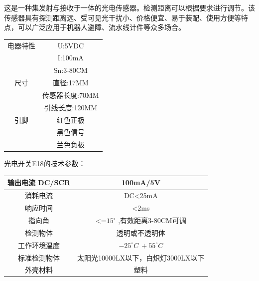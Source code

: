 \documentclass{ctexart}
\begin{document}
这是一种集发射与接收于一体的光电传感器。检测距离可以根据要求进行调节。该传感器具有探测距离远、受可见光干扰小、价格便宜、易于装配、使用方便等特点，可以广泛应用于机器人避障、流水线计件等众多场合。
\begin{center}
\begin{longtable}{|c|c|}
\hline
电器特性&U:5VDC\\
&I:100mA\\
&Sn:3-80CM\\
\hline
尺寸&直径:17MM\\
&传感器长度:70MM\\
&引线长度:120MM\\
\hline
引脚&红色正极\\
&黑色信号\\
&兰色负极\\
\hline
\end{longtable}
\end{center}
光电开关E18的技术参数：\par
\begin{center}
\begin{longtable}{|c|c|}
\hline
输出电流 DC/SCR&100mA/5V\\
\hline
消耗电流&DC<25mA\\
\hline
响应时间&<2ms\\
\hline
指向角&<=$15^{\circ}$ ,有效距离3-80CM可调\\
\hline
检测物体&透明或不透明体\\
\hline
工作环境温度&$-25^{\circ}C~+55^{\circ}C$\\
\hline
标准检测物体&太阳光10000LX以下，白炽灯3000LX以下\\
\hline
外壳材料&塑料\\
\hline
\end{longtable}
\end{center}
\end{document}
